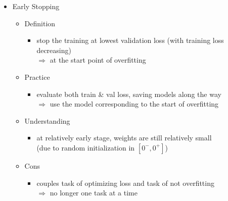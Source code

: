\begin{itemize}
\item Early Stopping
	\begin{itemize}
	\item Definition
		\begin{itemize}
		\item stop the training at lowest validation loss (with training loss decreasing) \\
		$\Rightarrow$ at the start point of overfitting
		\end{itemize}
	\item Practice
		\begin{itemize}
		\item evaluate both train \& val loss, saving models along the way \\
		$\Rightarrow$ use the model corresponding to the start of overfitting
		\end{itemize}
	\item Understanding
		\begin{itemize}
		\item at relatively early stage, weights are still relatively small \\ 
		(due to random initialization in $[0^-, 0^+]$)
		\end{itemize}
	\item Cons
		\begin{itemize}
		\item couples task of optimizing loss and task of not overfitting \\
		$\Rightarrow$ no longer one task at a time
		\end{itemize}
	\end{itemize}
\end{itemize}

